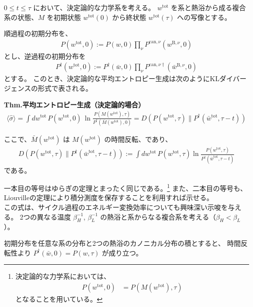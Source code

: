 \documentclass[a4paper,11pt]{jsarticle}
\numberwithin{equation}{section}
\begin{document}
$0 \leq t \leq \tau$ において、決定論的な力学系を考える。
$w^{\mathrm{tot}}$ を系と熱浴から成る複合系の状態、$M$ を初期状態 $w^{\mathrm{tot}}(0)$ から終状態 $w^{\mathrm{tot}}(\tau)$ への写像とする。

順過程の初期分布を、
\begin{align}
    P(w^{\mathrm{tot}}, 0) := P(w, 0) \prod_{\nu} P^{\mathrm{can}, \nu}(w^{\mathrm{B}, \nu}, 0)
\end{align}
とし、逆過程の初期分布を
\begin{align}
    P^{\dagger}(w^{\mathrm{tot}}, 0) := P^{\dagger}(\bar{w},0) \prod_{\nu} P^{\mathrm{can}, \nu\dagger}(\bar{w}^{\mathrm{B}, \nu}, 0)
\end{align}
とする。
このとき、決定論的な平均エントロピー生成は次のようにKLダイバージェンスの形式で表される。
\begin{itembox}[l]{\textbf{Thm.平均エントロピー生成（決定論的場合）}}
    \begin{align}
\langle \hat{\sigma} \rangle
= \int dw^{\mathrm{tot}}\, P(w^{\mathrm{tot}}, 0)\, \ln \frac{P(M(w^{\mathrm{tot}}), \tau)}{P^{\dagger}(\bar{M}(w^{\mathrm{tot}}), 0)}
= D(P(w^{\mathrm{tot}}, \tau) \| P^{\dagger}(\bar{w}^{\mathrm{tot}}, \tau - t))
\end{align}

ここで、$\bar{M}(w^{\mathrm{tot}})$ は $M(w^{\mathrm{tot}})$ の時間反転、であり、
\begin{align}
D(P(w^{\mathrm{tot}}, \tau) \| P^{\dagger}(\bar{w}^{\mathrm{tot}}, \tau - t))
:= \int dw^{\mathrm{tot}}\, P(w^{\mathrm{tot}}, \tau) \ln \frac{P(w^{\mathrm{tot}}, \tau)}{P^{\dagger}(\bar{w}^{\mathrm{tot}}, \tau - t)}
\end{align}
である。
\end{itembox}
一本目の等号はゆらぎの定理とまったく同じである。\footnote{
    決定論的な力学系においては、
    \begin{align}
         P(w^{\mathrm{tot}}, 0) &= P(M(w^{\mathrm{tot}}), \tau) 
    \end{align}
    となることを用いている。

}
また、二本目の等号も、Liouvilleの定理により積分測度を保存することを利用すれば示せる。\\

この式は、サイクル過程のエネルギー変換効率についても興味深い示唆を与える。
2つの異なる温度 $\beta_H^{-1}$, $\beta_L^{-1}$ の熱浴と系からなる複合系を考える（$\beta_H < \beta_L$）。

初期分布を任意な系の分布と2つの熱浴のカノニカル分布の積とすると、
時間反転性より $P^{\dagger}(\bar{w}, 0) = P(w, \tau)$ が成り立つ。
\end{document}

